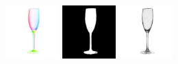     \includegraphics[width=0.155\textwidth]{ch-tomnet/images/Limitation/natural_57_057_IMG_5084crop_1_fcolor_r.jpg}
    \includegraphics[width=0.155\textwidth]{ch-tomnet/images/Limitation/natural_57_057_IMG_5084crop_3_mask_r.jpg}
    \includegraphics[width=0.155\textwidth]{ch-tomnet/images/Limitation/natural_57_057_IMG_5084crop_4_rho_r.jpg}
\\
